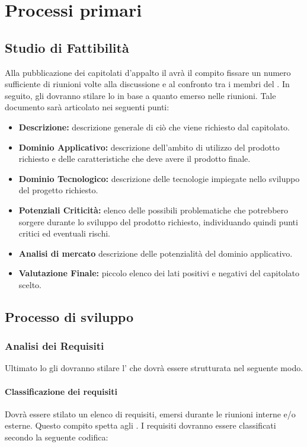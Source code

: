 \section{Processi primari}
\subsection{Studio di Fattibilità}
Alla pubblicazione dei capitolati d'appalto il \textit{\Pm} avrà il compito fissare un
numero sufficiente di riunioni volte alla discussione e al confronto tra i membri del .
In seguito, gli \textit{\AnP} dovranno stilare lo \textit{\SdF} in base a quanto
emerso nelle riunioni. Tale documento sarà articolato nei seguenti punti:
\begin{itemize}
	\item \textbf{Descrizione:} descrizione generale di ciò che viene richiesto
	dal capitolato.
	\item \textbf{Dominio Applicativo:} descrizione dell'ambito di utilizzo del
	prodotto richiesto e delle caratteristiche che deve avere il prodotto finale.
	\item \textbf{Dominio Tecnologico:} descrizione delle tecnologie impiegate
	nello sviluppo del progetto richiesto.
	\item \textbf{Potenziali Criticità:} elenco delle possibili problematiche che potrebbero
	sorgere durante lo sviluppo del prodotto richiesto, individuando quindi punti
	critici ed eventuali rischi.
	\item \textbf{Analisi di mercato} descrizione delle potenzialità del dominio applicativo.
	\item \textbf{Valutazione Finale:} piccolo elenco dei lati positivi e negativi del capitolato scelto.
\end{itemize}

\subsection{Processo di sviluppo}
\subsubsection{Analisi dei Requisiti}
Ultimato lo \textit{\SdF} gli \textit{\AnP} dovranno stilare l'\textit{\AdR} che dovrà 	essere strutturata nel seguente modo.
\paragraph{Classificazione dei requisiti}
Dovrà essere stilato un elenco di requisiti, emersi durante le riunioni interne
e/o esterne. Questo compito spetta agli \textit{\AnP}. I requisiti dovranno
essere classificati secondo la seguente codifica:

